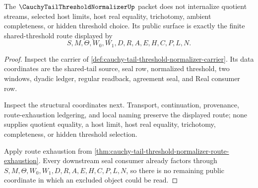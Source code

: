 \begin{theorem}
\label{thm:cauchy-tail-threshold-normalizer-noninternalization}
The $\CauchyTailThresholdNormalizerUp$ packet does not internalize quotient streams, selected host limits, host real equality, trichotomy, ambient completeness, or hidden threshold choice. Its public surface is exactly the finite shared-threshold route displayed by
$$
S,M,\Theta,W_0,W_1,D,R,A,E,H,C,P,L,N.
$$
\end{theorem}
\begin{proof}
Inspect the carrier of \autoref{def:cauchy-tail-threshold-normalizer-carrier}. Its data coordinates are the shared-tail source, seal row, normalized threshold, two windows, dyadic ledger, regular readback, agreement seal, and Real consumer row.

Inspect the structural coordinates next. Transport, continuation, provenance, route-exhaustion ledgering, and local naming preserve the displayed route; none supplies quotient equality, a host limit, host real equality, trichotomy, completeness, or hidden threshold selection.

Apply route exhaustion from \autoref{thm:cauchy-tail-threshold-normalizer-route-exhaustion}. Every downstream seal consumer already factors through $S,M,\Theta,W_0,W_1,D,R,A,E,H,C,P,L,N$, so there is no remaining public coordinate in which an excluded object could be read.
\end{proof}

